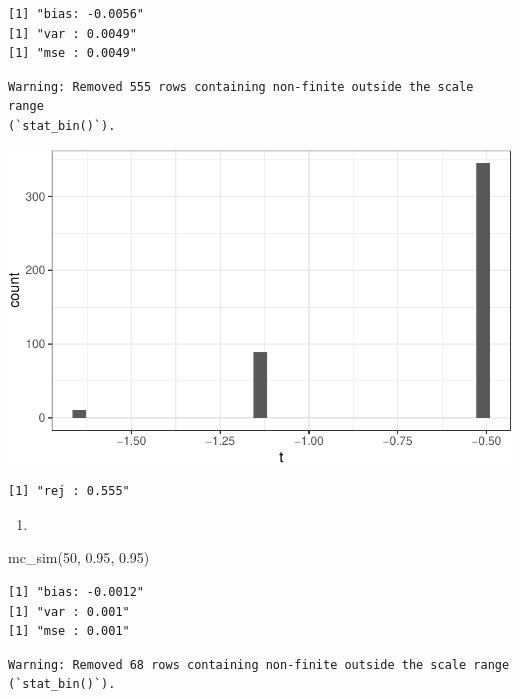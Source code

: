\documentclass[
  letterpaper,
  DIV=11,
  numbers=noendperiod]{scrreprt}
\newenvironment{Shaded}{\begin{snugshade}}{\end{snugshade}}
\newcommand{\DecValTok}[1]{\textcolor[rgb]{0.68,0.00,0.00}{#1}}
\newcommand{\FloatTok}[1]{\textcolor[rgb]{0.68,0.00,0.00}{#1}}
\newcommand{\FunctionTok}[1]{\textcolor[rgb]{0.28,0.35,0.67}{#1}}
\newcommand{\NormalTok}[1]{\textcolor[rgb]{0.00,0.23,0.31}{#1}}
\providecommand{\tightlist}{%
  \setlength{\itemsep}{0pt}\setlength{\parskip}{0pt}}\usepackage{longtable,booktabs,array}
\begin{document}
\begin{verbatim}
[1] "bias: -0.0056"
[1] "var : 0.0049"
[1] "mse : 0.0049"
\end{verbatim}

\begin{verbatim}
Warning: Removed 555 rows containing non-finite outside the scale range
(`stat_bin()`).
\end{verbatim}

\includegraphics{03-estimators_files/figure-pdf/unnamed-chunk-16-1.pdf}

\begin{verbatim}
[1] "rej : 0.555"
\end{verbatim}

\begin{enumerate}
\def\labelenumi{\arabic{enumi}.}
\setcounter{enumi}{8}
\tightlist
\item
\end{enumerate}

\begin{Shaded}
\begin{Highlighting}[]
\FunctionTok{mc\_sim}\NormalTok{(}\DecValTok{50}\NormalTok{, }\FloatTok{0.95}\NormalTok{, }\FloatTok{0.95}\NormalTok{)}
\end{Highlighting}
\end{Shaded}

\begin{verbatim}
[1] "bias: -0.0012"
[1] "var : 0.001"
[1] "mse : 0.001"
\end{verbatim}

\begin{verbatim}
Warning: Removed 68 rows containing non-finite outside the scale range
(`stat_bin()`).
\end{verbatim}
\end{document}
